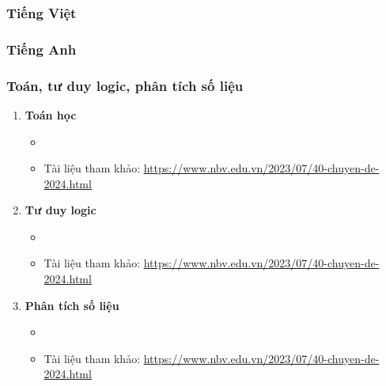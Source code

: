 \subsubsection{Tiếng Việt}
\subsubsection{Tiếng Anh}
\subsubsection{Toán, tư duy logic, phân tích số liệu}
\begin{enumerate}
    \item \textbf{Toán học}
    \begin{itemize}
        \item
        \item Tài liệu tham khảo: \href{https://www.nbv.edu.vn/2023/07/40-chuyen-de-2024.html}{https://www.nbv.edu.vn/2023/07/40-chuyen-de-2024.html}
    \end{itemize}
    
    \item \textbf{Tư duy logic}
    \begin{itemize}
        \item
        \item Tài liệu tham khảo: \href{https://www.nbv.edu.vn/2023/07/40-chuyen-de-2024.html}{https://www.nbv.edu.vn/2023/07/40-chuyen-de-2024.html}
    \end{itemize}
    \item \textbf{Phân tích số liệu}
    \begin{itemize}
        \item
        \item Tài liệu tham khảo: \href{https://www.nbv.edu.vn/2023/07/40-chuyen-de-2024.html}{https://www.nbv.edu.vn/2023/07/40-chuyen-de-2024.html}
    \end{itemize}
\end{enumerate}
